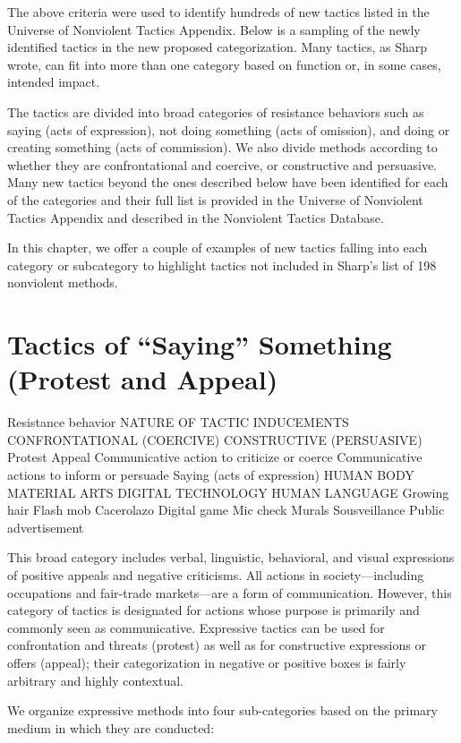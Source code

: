 \documentclass[twoside,a4paper,12pt,fleqn,openany]{extbook}
\begin{document}
The above criteria were used to identify hundreds of new tactics listed in the Universe of Nonviolent Tactics Appendix. Below is a sampling of the newly identified tactics in the new proposed categorization. Many tactics, as Sharp wrote, can fit into more than one category based on function or, in some cases, intended impact.

The tactics are divided into broad categories of resistance behaviors such as saying (acts of expression), not doing something (acts of omission), and doing or creating something (acts of commission). We also divide methods according to whether they are confrontational and coercive, or constructive and persuasive. Many new tactics beyond the ones described below have been identified for each of the categories and their full list is provided in the Universe of Nonviolent Tactics Appendix and described in the Nonviolent Tactics Database.

In this chapter, we offer a couple of examples of new tactics falling into each category or subcategory to highlight tactics not included in Sharp’s list of 198 nonviolent methods.

\section*{Tactics of “Saying” Something (Protest and Appeal)}

Resistance behavior
NATURE OF TACTIC INDUCEMENTS
CONFRONTATIONAL (COERCIVE)
CONSTRUCTIVE (PERSUASIVE)
Protest
Appeal
Communicative action to criticize or coerce
Communicative actions to inform or persuade
Saying
(acts of expression)
HUMAN BODY
MATERIAL ARTS
DIGITAL TECHNOLOGY
HUMAN LANGUAGE
Growing hair
Flash mob
Cacerolazo
Digital game
Mic check
Murals
Sousveillance
Public advertisement

This broad category includes verbal, linguistic, behavioral, and visual expressions of positive appeals and negative criticisms. All actions in society—including occupations and fair-trade markets—are a form of communication. However, this category of tactics is designated for actions whose purpose is primarily and commonly seen as communicative. Expressive tactics can be used for confrontation and threats (protest) as well as for constructive expressions or offers (appeal); their categorization in negative or positive boxes is fairly arbitrary and highly contextual.

We organize expressive methods into four sub-categories based on the primary medium in which they are conducted:
\end{document}
